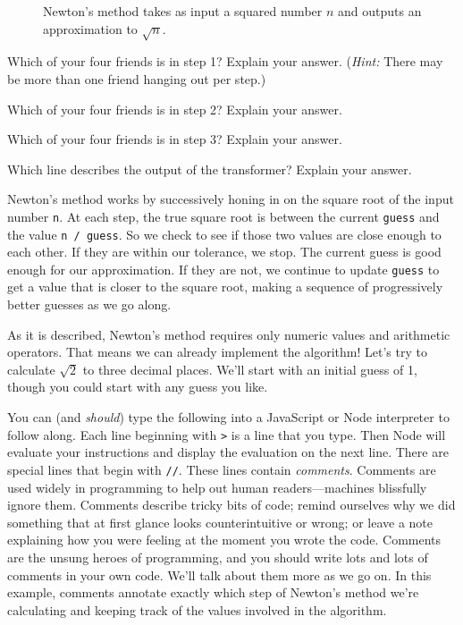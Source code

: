 \begin{figure*}
  
\caption{\label{fig:intro-newton-fundamental-diagram} Newton's method takes as
input a squared number $n$ and outputs an approximation to $\sqrt{n}$.}
\end{figure*}

\begin{question}
Which of your four friends is in step 1? Explain your answer. (\textit{Hint:}
There may be more than one friend hanging out per step.)
\end{question}

\begin{question}
  Which of your four friends is in step 2? Explain your answer.
\end{question}

\begin{question}
  Which of your four friends is in step 3? Explain your answer.
\end{question}

\begin{question}
  Which line describes the output of the transformer? Explain your answer.
\end{question}

Newton's method works by successively honing in on the square root of the input
number \texttt{n}. At each step, the true square root is between the current
\texttt{guess} and the value \texttt{n / guess}. So we check to see if those two
values are close enough to each other. If they are within our tolerance, we
stop. The current guess is good enough for our approximation. If they are not,
we continue to update \texttt{guess} to get a value that is closer to the square
root, making a sequence of progressively better guesses as we go along.

As it is described, Newton's method requires only numeric values and arithmetic
operators. That means we can already implement the algorithm! Let's try to
calculate $\sqrt{2}$ to three decimal places. We'll start with an initial guess
of 1, though you could start with any guess you like.

You can (and \emph{should}) type the following into a JavaScript or Node
interpreter to follow along. Each line beginning with \texttt{>} is a line that
you type. Then Node will evaluate your instructions and display the evaluation
on the next line. There are special lines that begin with \texttt{//}. These
lines contain \emph{comments}. Comments are used widely in programming to help
out human readers---machines blissfully ignore them. Comments describe tricky
bits of code; remind ourselves why we did something that at first glance looks
counterintuitive or wrong; or leave a note explaining how you were feeling at
the moment you wrote the code. Comments are the unsung heroes of programming,
and you should write lots and lots of comments in your own code. We'll talk
about them more as we go on. In this example, comments annotate exactly which
step of Newton's method we're calculating and keeping track of the values
involved in the algorithm.

